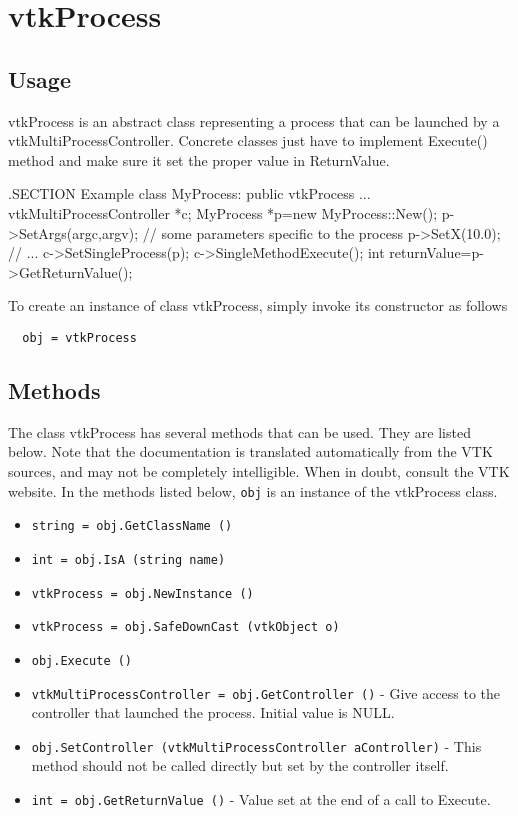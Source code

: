 \section{vtkProcess}

\subsection{Usage}

 vtkProcess is an abstract class representing a process that can be launched
 by a vtkMultiProcessController. Concrete classes just have to implement
 Execute() method and make sure it set the proper value in ReturnValue.

 .SECTION Example
  class MyProcess: public vtkProcess
  ...
  vtkMultiProcessController *c;
  MyProcess *p=new MyProcess::New();
  p->SetArgs(argc,argv); // some parameters specific to the process
  p->SetX(10.0); // ...
  c->SetSingleProcess(p);
  c->SingleMethodExecute();
  int returnValue=p->GetReturnValue();


To create an instance of class vtkProcess, simply
invoke its constructor as follows
\begin{verbatim}
  obj = vtkProcess
\end{verbatim}
\subsection{Methods}

The class vtkProcess has several methods that can be used.
  They are listed below.
Note that the documentation is translated automatically from the VTK sources,
and may not be completely intelligible.  When in doubt, consult the VTK website.
In the methods listed below, \verb|obj| is an instance of the vtkProcess class.
\begin{itemize}
\item  \verb|string = obj.GetClassName ()|

\item  \verb|int = obj.IsA (string name)|

\item  \verb|vtkProcess = obj.NewInstance ()|

\item  \verb|vtkProcess = obj.SafeDownCast (vtkObject o)|

\item  \verb|obj.Execute ()|

\item  \verb|vtkMultiProcessController = obj.GetController ()| -  Give access to the controller that launched the process.
 Initial value is NULL.

\item  \verb|obj.SetController (vtkMultiProcessController aController)| -  This method should not be called directly but set by the controller
 itself.

\item  \verb|int = obj.GetReturnValue ()| -  Value set at the end of a call to Execute.

\end{itemize}
